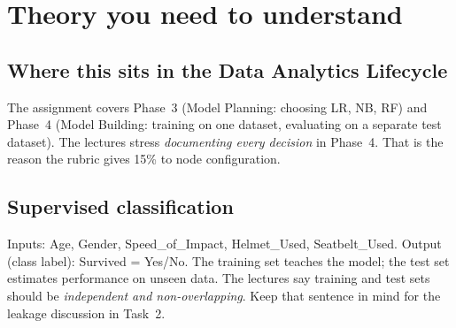 \documentclass[11pt,a4paper]{article}
\begin{document}
\section{Theory you need to understand}

\subsection{Where this sits in the Data Analytics Lifecycle}
The assignment covers Phase~3 (Model Planning: choosing LR, NB, RF) and Phase~4 (Model Building:
training on one dataset, evaluating on a separate test dataset). The lectures stress
\emph{documenting every decision} in Phase~4. That is the reason the rubric gives 15\% to node
configuration.

\subsection{Supervised classification}
Inputs: Age, Gender, Speed\_of\_Impact, Helmet\_Used, Seatbelt\_Used. Output (class label):
Survived = Yes/No. The training set teaches the model; the test set estimates performance on
unseen data. The lectures say training and test sets should be \emph{independent and
non-overlapping}. Keep that sentence in mind for the leakage discussion in Task~2.
\end{document}
